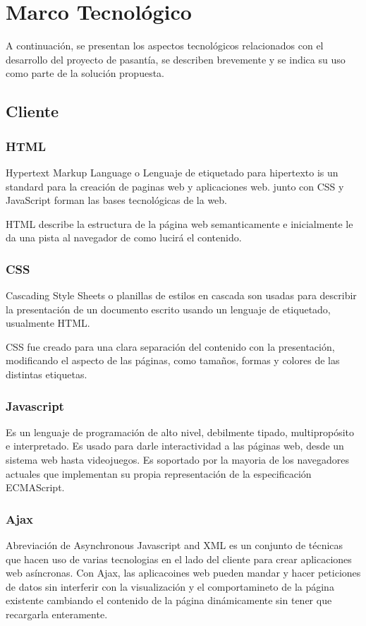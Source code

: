 \chapter{Marco Tecnológico}
\thispagestyle{empty} %

A continuación, se presentan los aspectos tecnológicos relacionados con el desarrollo del proyecto de pasantía, se describen brevemente y se indica su uso como parte de la solución propuesta.

\section{Cliente}

\subsection{HTML}

Hypertext Markup Language o Lenguaje de etiquetado para hipertexto is un standard para la creación de paginas web y aplicaciones web. junto con CSS y JavaScript forman las bases tecnológicas de la web.

HTML describe la estructura de la página web semanticamente e inicialmente le da una pista al navegador de como lucirá el contenido.


\subsection{CSS}
Cascading Style Sheets o planillas de estilos en cascada son usadas para describir la presentación de un documento escrito usando un lenguaje de etiquetado, usualmente HTML. 

CSS fue creado para una clara separación del contenido con la presentación, modificando el aspecto de las páginas, como tamaños, formas y colores de las distintas etiquetas.

\subsection{Javascript}
Es un lenguaje de programación de alto nivel, debilmente tipado, multipropósito e interpretado. Es usado para darle interactividad a las páginas web, desde un sistema web hasta videojuegos. Es soportado por la mayoria de los navegadores actuales que implementan su propia representación de la especificación ECMAScript.

\subsection{Ajax}
Abreviación de Asynchronous Javascript and XML es un conjunto de técnicas que hacen uso de varias tecnologias en el lado del cliente para crear aplicaciones web asíncronas. Con Ajax, las aplicacoines web pueden mandar y hacer peticiones de datos sin interferir con la visualización y el comportamineto de la página existente cambiando el contenido de la página dinámicamente sin tener que recargarla enteramente.

